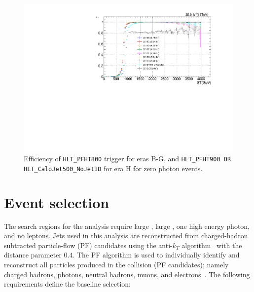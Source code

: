 \begin{figure}[htbp!]
  \centering
  \includegraphics[width=0.48\linewidth]{../Figures/Chap3/triggers/Run2016_MET_HT800or900_2016H_HT800or900orCaloJet500.pdf}
  \captionsetup{width=.9\linewidth}
  \caption[0 photon VR trigger efficiency]{Efficiency of \texttt{HLT\_PFHT800} trigger for eras B-G, and \texttt{HLT\_PFHT900 OR HLT\_CaloJet500\_NoJetID} for era H for zero photon events.}
  \label{fig:zeroPhotonTrigger_eff}
\end{figure}

\section{Event selection}
\label{sec:event-selection}
The search regions for the analysis require large \ptmiss,
large \ST, one high energy photon, and no leptons. 
Jets used in this analysis are reconstructed from charged-hadron 
subtracted  particle-flow (PF) candidates using the anti-$k_T$ 
algorithm~\cite{Cacciari:2008gp} with the distance parameter $0.4$. 
The PF algorithm is used to individually identify and reconstruct all particles
produced in the collision (PF candidates); namely charged hadrons, photons,
neutral hadrons, muons, and electrons~\cite{CMS-PRF-14-001}. 
The following requirements define the baseline selection:

